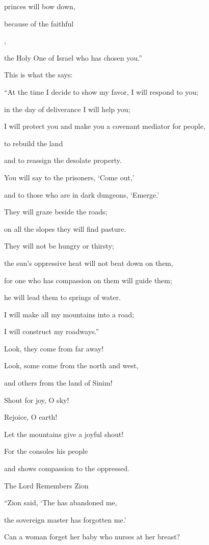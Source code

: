 {\par }{\Q princes
will bow
down,
\par }{\Q because
of the faithful

{},
\par }{\Q the Holy One
of Israel
who has chosen you.”
\par }{\Q {}This is what
the {}
says:
\par }{\Q “At the time
I decide to show my favor,
I will respond
to you;
\par }{\Q in the day
of deliverance
I will help
you;
\par }{\Q I will protect
you and make
you a covenant
mediator
for people,
\par }{\Q to rebuild the land
\par }{\Q and to reassign
the desolate
property.
\par }{\Q {}You will say
to the prisoners,
‘Come out,’
\par }{\Q and to those who
are in dark dungeons, ‘Emerge.’
\par }{\Q They will graze
beside the roads;
\par }{\Q on
all
the slopes
they will find pasture.
\par }{\Q {}They will not
be hungry
or thirsty;
\par }{\Q the sun’s
oppressive heat
will not
beat down
on them,

\par }{\Q for
one who has compassion
on
them will guide
them;
\par }{\Q he will lead
them to springs
of water.
\par }{\Q {}I will make
all
my mountains
into a road;
\par }{\Q I will construct
my roadways.”
\par }{\Q {}Look,
they come
from far
away!
\par }{\Q Look,
some come from the north
and west,
\par }{\Q and others
from the land
of Sinim!
\par }{\Q {}Shout
for joy, O sky!

\par }{\Q Rejoice,
O earth!
\par }{\Q Let the mountains
give a joyful
shout!
\par }{\Q For
the {}
consoles
his people
\par }{\Q and shows compassion
to the oppressed.
\par }{\SH The Lord Remembers Zion
\par }{\Q {}“Zion
said,
‘The
{}
has abandoned
me,
\par }{\Q the sovereign
master has forgotten me.’
\par }{\Q {}Can a woman
forget
her baby who nurses at her breast?

}
